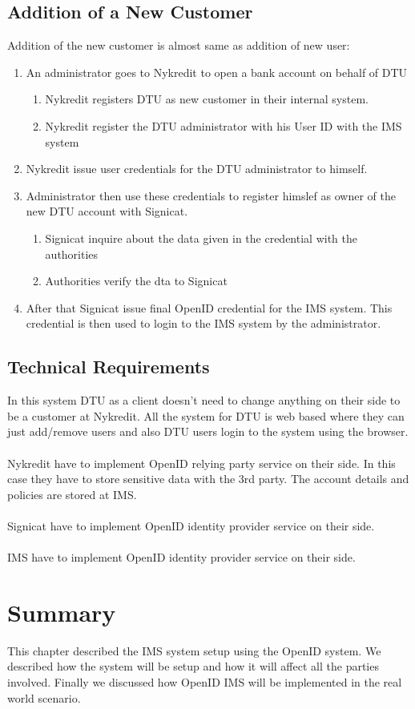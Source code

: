 \FloatBarrier
\subsection{Addition of a New Customer}
Addition of the new customer is almost same as addition of new user:
\begin{enumerate}
	\item An administrator goes to Nykredit to open a bank account on behalf of DTU 
	\begin{enumerate}
		\item Nykredit registers DTU as new customer in their internal system.
		\item Nykredit register the DTU administrator with his User ID with the IMS system
	\end{enumerate}
	\item Nykredit issue user credentials for the  DTU administrator to himself.
	\item Administrator then use these credentials to register himslef as owner of the new DTU account with Signicat. 
	\begin{enumerate}
		\item Signicat inquire about the data given in the credential with the authorities
		\item Authorities verify the dta to Signicat
	\end{enumerate}
	\item After that Signicat issue final OpenID credential for the IMS system. This credential is then used to login to the IMS system by the administrator.
\end{enumerate}
\subsection{Technical Requirements}
In this system DTU as a client doesn't need to change anything on their side to be a customer at Nykredit. All the system for DTU is web based where they can just add/remove users and also DTU users login to the system using the browser.
\\
\\Nykredit have to implement OpenID relying party service on their side. In this case they have to store sensitive data with the 3rd party. The account details and policies are stored at IMS.
\\
\\Signicat have to implement OpenID identity provider service on their side.
\\\\
IMS have to implement  OpenID identity provider service on their side.
\section{Summary}
This chapter described the IMS system setup using the OpenID system. We described how the system will be setup and how it will affect all the parties involved. Finally we discussed how OpenID IMS will be implemented in the real world scenario.

